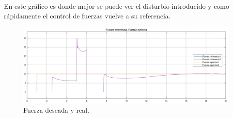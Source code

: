 En este gráfico es donde mejor se puede ver el disturbio introducido y como rápidamente el control de fuerzas vuelve a su referencia.

\begin{figure}[H]
	\centering
	\includegraphics[width=0.8\linewidth]{ImagenesControl híbrido no lineal/3_3_f_e}
	\caption{Fuerza deseada y real.}	
	\label{fig:cfd}
\end{figure}
%